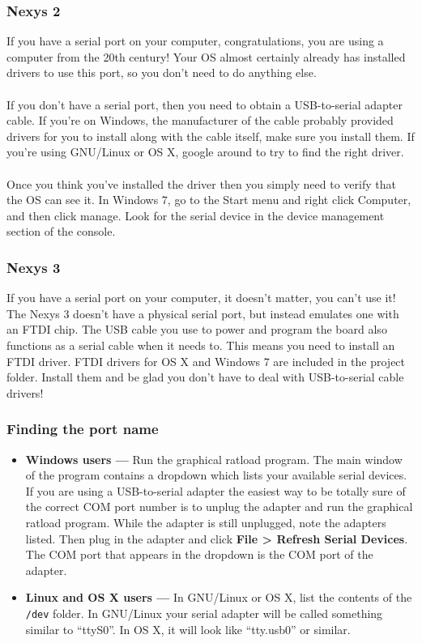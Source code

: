 \documentclass[notitlepage]{article}
\begin{document}
\subsubsection{Nexys 2}
If you have a serial port on your computer, congratulations, you are using a computer from the 20th century! Your OS almost certainly already has installed drivers to use this port, so you don't need to do anything else.\\\\
If you don't have a serial port, then you need to obtain a USB-to-serial adapter cable. If you're on Windows, the manufacturer of the cable probably provided drivers for you to install along with the cable itself, make sure you install them. If you're using GNU/Linux or OS X, google around to try to find the right driver.\\\\
Once you think you've installed the driver then you simply need to verify that the OS can see it. In Windows 7, go to the Start menu and right click Computer, and then click manage. Look for the serial device in the device management section of the console. 

\subsubsection{Nexys 3}
If you have a serial port on your computer, it doesn't matter, you can't use it! The Nexys 3 doesn't have a physical serial port, but instead emulates one with an FTDI chip. The USB cable you use to power and program the board also functions as a serial cable when it needs to. This means you need to install an FTDI driver. FTDI drivers for OS X and Windows 7 are included in the project folder. Install them and be glad you don't have to deal with USB-to-serial cable drivers!

\subsubsection{Finding the port name}
\begin{itemize}
\item \textbf{Windows users --- } Run the graphical ratload program. The main window of the program contains a dropdown which lists your available serial devices. If you are using a USB-to-serial adapter the easiest way to be totally sure of the correct COM port number is to unplug the adapter and run the graphical ratload program. While the adapter is still unplugged, note the adapters listed. Then plug in the adapter and click \textbf{File > Refresh Serial Devices}. The COM port that appears in the dropdown is the COM port of the adapter.

\item \textbf{Linux and OS X users --- } In GNU/Linux or OS X, list the contents of the \texttt{/dev} folder. In GNU/Linux your serial adapter will be called something similar to ``ttyS0''. In OS X, it will look like ``tty.usb0'' or similar.
\end{itemize}
\end{document}
